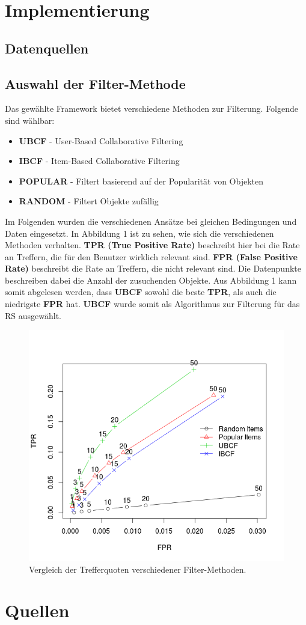 \documentclass[german,a4paper]{article}
\begin{document}
\section{Implementierung}
\subsection{Datenquellen}

\subsection{Auswahl der Filter-Methode}
Das gewählte Framework bietet verschiedene Methoden zur Filterung.
Folgende sind wählbar:
\begin{itemize}
\item \textbf{UBCF} - User-Based Collaborative Filtering
\item \textbf{IBCF} - Item-Based Collaborative Filtering
\item \textbf{POPULAR} - Filtert basierend auf der Popularität von Objekten
\item \textbf{RANDOM} - Filtert Objekte zufällig
\end{itemize}
Im Folgenden wurden die verschiedenen Ansätze bei gleichen Bedingungen und Daten eingesetzt. In Abbildung 1 ist zu sehen, wie sich die verschiedenen Methoden verhalten. \textbf{TPR (True Positive Rate)} beschreibt hier bei die Rate an Treffern, die für den Benutzer wirklich relevant sind. \textbf{FPR (False Positive Rate)} beschreibt die Rate an Treffern, die nicht relevant sind. Die Datenpunkte beschreiben dabei die Anzahl der zusuchenden Objekte. Aus Abbildung 1 kann somit abgelesen werden, dass \textbf{UBCF} sowohl die beste \textbf{TPR}, als auch die niedrigste \textbf{FPR} hat. \textbf{UBCF} wurde somit als Algorithmus zur Filterung für das RS ausgewählt.
\begin{figure}[H]
\centering
\includegraphics[width=\textwidth]{TPRFPR.png}
\caption{Vergleich der Trefferquoten verschiedener Filter-Methoden.}
\end{figure}
\section{Quellen}
\end{document}
